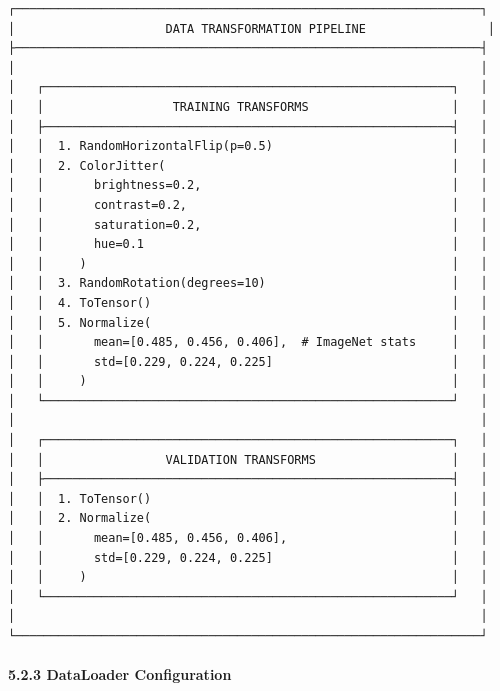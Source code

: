 \begin{verbatim}
┌─────────────────────────────────────────────────────────────────┐
│                     DATA TRANSFORMATION PIPELINE                 │
├─────────────────────────────────────────────────────────────────┤
│                                                                 │
│   ┌─────────────────────────────────────────────────────────┐   │
│   │                  TRAINING TRANSFORMS                    │   │
│   ├─────────────────────────────────────────────────────────┤   │
│   │  1. RandomHorizontalFlip(p=0.5)                         │   │
│   │  2. ColorJitter(                                        │   │
│   │       brightness=0.2,                                   │   │
│   │       contrast=0.2,                                     │   │
│   │       saturation=0.2,                                   │   │
│   │       hue=0.1                                           │   │
│   │     )                                                   │   │
│   │  3. RandomRotation(degrees=10)                          │   │
│   │  4. ToTensor()                                          │   │
│   │  5. Normalize(                                          │   │
│   │       mean=[0.485, 0.456, 0.406],  # ImageNet stats     │   │
│   │       std=[0.229, 0.224, 0.225]                         │   │
│   │     )                                                   │   │
│   └─────────────────────────────────────────────────────────┘   │
│                                                                 │
│   ┌─────────────────────────────────────────────────────────┐   │
│   │                 VALIDATION TRANSFORMS                   │   │
│   ├─────────────────────────────────────────────────────────┤   │
│   │  1. ToTensor()                                          │   │
│   │  2. Normalize(                                          │   │
│   │       mean=[0.485, 0.456, 0.406],                       │   │
│   │       std=[0.229, 0.224, 0.225]                         │   │
│   │     )                                                   │   │
│   └─────────────────────────────────────────────────────────┘   │
│                                                                 │
└─────────────────────────────────────────────────────────────────┘
\end{verbatim}

\paragraph{5.2.3 DataLoader
Configuration}\label{dataloader-configuration}

